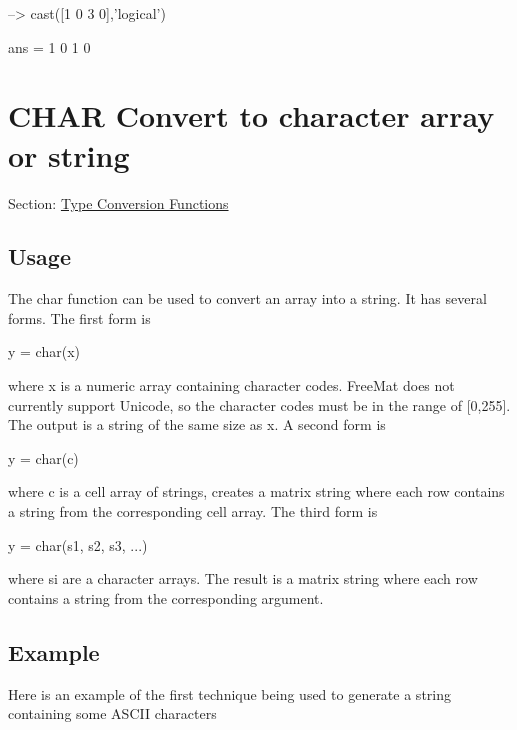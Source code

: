 \begin{DoxyVerbInclude}
--> cast([1 0 3 0],'logical')

ans = 
 1 0 1 0 
\end{DoxyVerbInclude}
 \hypertarget{typecast_char}{}\section{C\-H\-A\-R Convert to character array or string}\label{typecast_char}
Section\-: \hyperlink{sec_typecast}{Type Conversion Functions} \hypertarget{vtkwidgets_vtkxyplotwidget_Usage}{}\subsection{Usage}\label{vtkwidgets_vtkxyplotwidget_Usage}
The {\ttfamily char} function can be used to convert an array into a string. It has several forms. The first form is \begin{DoxyVerb}   y = char(x)
\end{DoxyVerb}
 where {\ttfamily x} is a numeric array containing character codes. Free\-Mat does not currently support Unicode, so the character codes must be in the range of {\ttfamily \mbox{[}0,255\mbox{]}}. The output is a string of the same size as {\ttfamily x}. A second form is \begin{DoxyVerb}   y = char(c)
\end{DoxyVerb}
 where {\ttfamily c} is a cell array of strings, creates a matrix string where each row contains a string from the corresponding cell array. The third form is \begin{DoxyVerb}   y = char(s1, s2, s3, ...)
\end{DoxyVerb}
 where {\ttfamily si} are a character arrays. The result is a matrix string where each row contains a string from the corresponding argument. \hypertarget{variables_struct_Example}{}\subsection{Example}\label{variables_struct_Example}
Here is an example of the first technique being used to generate a string containing some A\-S\-C\-I\-I characters


\begin{DoxyVerbInclude}
--> char([32:64;65:97])

ans = 
 !"#$%
ABCDEFGHIJKLMNOPQRSTUVWXYZ[\]^_`a
\end{DoxyVerbInclude}


